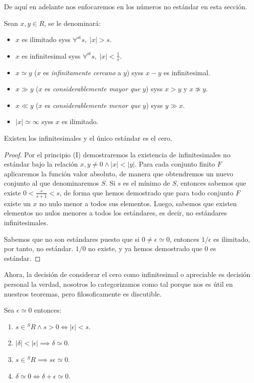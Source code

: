 \documentclass[11pt,oneside,a4paper]{book}
\DeclareMathOperator{\st}{st}
\newcommand{\forallst}{\forall^{\st}}
\begin{document}
De aquí en adelante nos enfocaremos en los números no estándar en esta sección.
\begin{mydef}
	Sean $x,y\in R$, se le denominará:
	\begin{itemize}
		\item $x$ es ilimitado syss $\forallst s,\;|x|\gt s$.
		\item $x$ es infinitesimal syss $\forallst s,\;|x|\lt\frac 1s$.
		\item $x\simeq y$ ($x$ es \textit{infinitamente cercano} a $y$) syss $x-y$ es infinitesimal.
		\item $x\gg y$ ($x$ es \textit{considerablemente mayor que} $y$) syss $x\gt y$ y $x\not\simeq y$.
		\item $x\ll y$ ($x$ es \textit{considerablemente menor que} $y$) syss $y\gg x$.
		\item $|x|\simeq\infty$ syss $x$ es ilimitado.
	\end{itemize}
\end{mydef}
\begin{thm}\label{thm:infinitesimals}
Existen los infinitesimales y el único estándar es el cero.
\end{thm}
\begin{proof}
Por el principio (I) demostraremos la existencia de infinitesimales no estándar bajo la relación $x,y\neq 0\wedge|x|\lt|y|$. Para cada conjunto finito $F$ aplicaremos la función valor absoluto, de manera que obtendremos un nuevo conjunto al que denominaremos $S$. Si $s$ es el mínimo de $S$, entonces sabemos que existe $0\lt\frac{s}{s+1}\lt s$, de forma que hemos demostrado que para todo conjunto $F$ existe un $x$ no nulo menor a todos sus elementos. Luego, sabemos que existen elementos no nulos menores a todos los estándares, es decir, no estándares infinitesimales.

Sabemos que no son estándares puesto que si $0\neq\epsilon\simeq 0$, entonces $1/\epsilon$ es ilimitado, por tanto, no estándar. $1/0$ no existe, y ya hemos demostrado que 0 es estándar.
\end{proof}
Ahora, la decisión de considerar el cero como infinitesimal o apreciable es decisión personal la verdad, nosotros lo categorizamos como tal porque nos es útil en nuestros teoremas, pero filosoficamente es discutible.
\begin{thm}
Sea $\epsilon\simeq 0$ entonces:
\begin{enumerate}[$a$)]
\item $s\in{^SR}\wedge s\gt 0\iff|\epsilon|\lt s$.
\item $|\delta|\lt|\epsilon|\implies\delta\simeq 0$.
\item $s\in{^SR}\implies s\epsilon\simeq 0$.
\item $\delta\simeq 0\iff\delta+\epsilon\simeq 0$.
\end{enumerate}
\end{thm}
\end{document}
